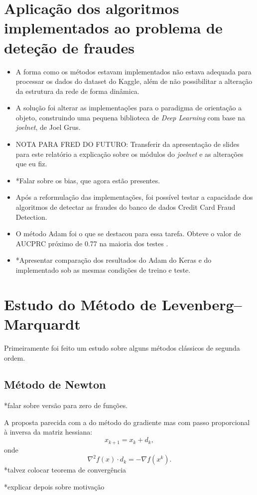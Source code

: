 \documentclass[a4paper,12pt]{article}
\begin{document}
\section*{Aplicação dos algoritmos implementados ao problema de deteção de fraudes}
\begin{itemize}
\item A forma como os métodos estavam implementados não estava adequada para processar os dados do dataset do Kaggle, além de não possibilitar a alteração da estrutura da rede de forma dinâmica.
\item A solução foi alterar as implementações para o paradigma de orientação a objeto, construindo uma pequena biblioteca de \textit{Deep Learning} com base na \textit{joelnet}, de Joel Grus.
\item NOTA PARA FRED DO FUTURO: Transferir da apresentação de slides para este relatório a explicação sobre os módulos do \textit{joelnet} e as alterações que eu fiz.

\item *Falar sobre os bias, que agora estão presentes.
\item Após a reformulação das implementações, foi possível testar a capacidade dos algoritmos de detectar as fraudes do banco de dados Credit Card Fraud Detection.
\item O método Adam foi o que se destacou para essa tarefa. Obteve o valor de AUCPRC próximo de 0.77 na maioria dos testes .
\item *Apresentar comparação dos resultados do Adam do Keras e do implementado sob as mesmas condições de treino e teste.   

\end{itemize}
\section*{Estudo do Método de Levenberg–Marquardt}
Primeiramente foi feito um estudo sobre alguns métodos clássicos de segunda ordem.
\subsection*{Método de Newton}
*falar sobre versão para zero de funções.

A proposta parecida com a do método do gradiente mas com passo proporcional à inversa da matriz hessiana: 
$$x_{k+1} = x_{k} + d_k ,$$
onde $$\nabla ^2 f(x)  \cdot d_k =  -\nabla f(x^k)  .$$
*talvez colocar teorema de convergência

*explicar depois sobre motivação
\end{document}
